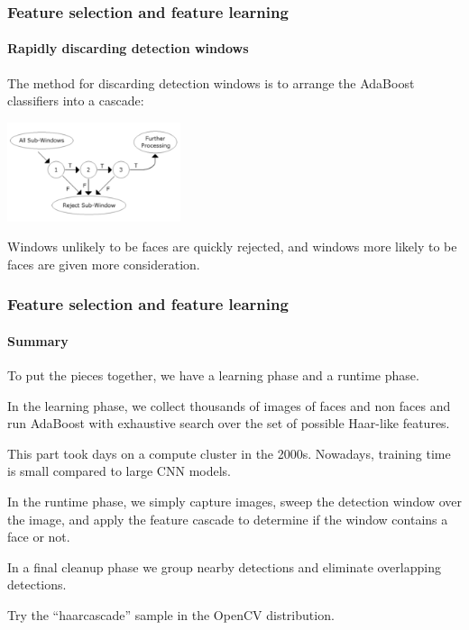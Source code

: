 \documentclass[aspectratio=169]{beamer}
\begin{document}
\begin{frame}
\frametitle{Feature selection and feature learning}
\framesubtitle{Rapidly discarding detection windows}

The method for discarding detection windows is to arrange the
AdaBoost classifiers into a \alert{cascade}:

\medskip

\centerline{\includegraphics[width=2in]{cascade}}

\medskip

Windows unlikely to be faces are quickly rejected, and windows more likely to
be faces are given more consideration.

\end{frame}


\begin{frame}
\frametitle{Feature selection and feature learning}
\framesubtitle{Summary}

To put the pieces together, we have a \alert{learning} phase and a
\alert{runtime} phase.

\medskip

In the learning phase, we collect thousands of images of faces and non faces
and run AdaBoost with exhaustive search over the set of possible
Haar-like features.

\medskip

This part took days on a compute cluster in the 2000s. Nowadays, training
time is small compared to large CNN models.

\medskip

In the runtime phase, we simply capture images, sweep the detection window
over the image, and apply the feature cascade to determine if the window
contains a face or not.

\medskip

In a final cleanup phase we group nearby detections and eliminate overlapping
detections.

\medskip

Try the ``haarcascade'' sample in the OpenCV distribution.

\end{frame}

\end{document}

